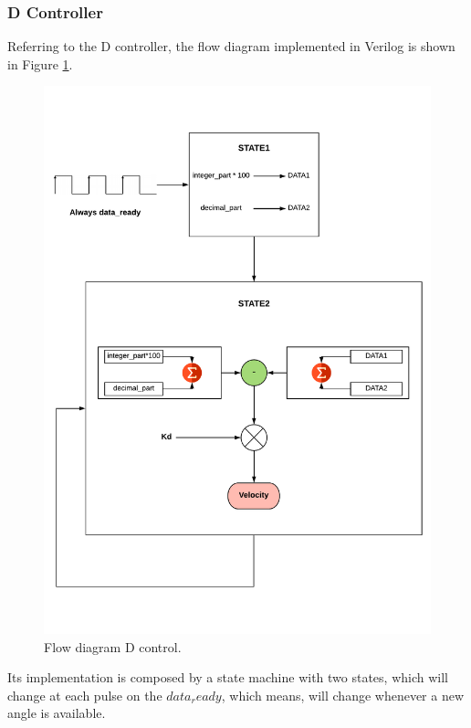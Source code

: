 \subsubsection{D Controller} \label{sec:ControladorD}

Referring to the D controller, the flow diagram implemented in Verilog is shown in Figure \ref{fig:D_control}. 
	\begin{figure}[H]
	\center
	\includegraphics[trim = 0cm 0cm 0mm 0cm, clip,scale=0.4]{imagenes/Balancing_robot/D.pdf}
	\caption{Flow diagram D control.}
	\label{fig:D_control}
\end{figure}

Its implementation is composed by a state machine with two states, which will change at each pulse on the $data_ready$, which means, will change whenever a new angle is available.\newline

